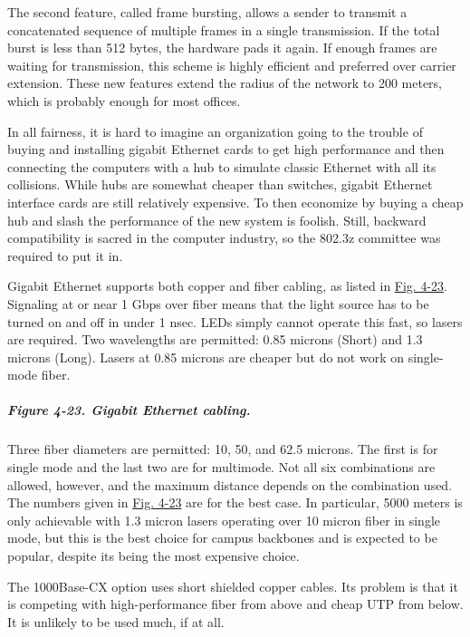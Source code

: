 \documentclass[b5paper,11pt]{memoir}
\begin{document}
The second feature, called {frame bursting}, allows a sender to transmit
a concatenated sequence of multiple frames in a single transmission. If
the total burst is less than 512 bytes, the hardware pads it again. If
enough frames are waiting for transmission, this scheme is highly
efficient and preferred over carrier extension. These new features
extend the radius of the network to 200 meters, which is probably enough
for most offices.

In all fairness, it is hard to imagine an organization going to the
trouble of buying and installing gigabit Ethernet cards to get high
performance and then connecting the computers with a hub to simulate
classic Ethernet with all its collisions. While hubs are somewhat
cheaper than switches, gigabit Ethernet interface cards are still
relatively expensive. To then economize by buying a cheap hub and slash
the performance of the new system is foolish. Still, backward
compatibility is sacred in the computer industry, so the 802.3z
committee was required to put it in.

Gigabit Ethernet supports both copper and fiber cabling, as listed in
\protect\hyperlink{0130661023_ch04lev1sec3.htmlux5cux23ch04fig23}{Fig.
4-23}. Signaling at or near 1 Gbps over fiber means that the light
source has to be turned on and off in under 1 nsec. LEDs simply cannot
operate this fast, so lasers are required. Two wavelengths are
permitted: 0.85 microns (Short) and 1.3 microns (Long). Lasers at 0.85
microns are cheaper but do not work on single-mode fiber.

\subparagraph[Figure 4-23. Gigabit Ethernet
cabling.]{\texorpdfstring{\protect\hypertarget{0130661023_ch04lev1sec3.htmlux5cux23ch04fig23}{}{}Figure
4-23. Gigabit Ethernet
cabling.}{Figure 4-23. Gigabit Ethernet cabling.}}


Three fiber diameters are permitted: 10, 50, and 62.5 microns. The first
is for single mode and the last two are for multimode. Not all six
combinations are allowed, however, and the maximum distance depends on
the combination used. The numbers given in
\protect\hyperlink{0130661023_ch04lev1sec3.htmlux5cux23ch04fig23}{Fig.
4-23} are for the best case. In particular, 5000 meters is only
achievable with 1.3 micron lasers operating over 10 micron fiber in
single mode, but this is the best choice for campus backbones and is
expected to be popular, despite its being the most expensive choice.

The 1000Base-CX option uses short shielded copper cables. Its problem is
that it is competing with high-performance fiber from above and cheap
UTP from below. It is unlikely to be used much, if at all.
\end{document}

